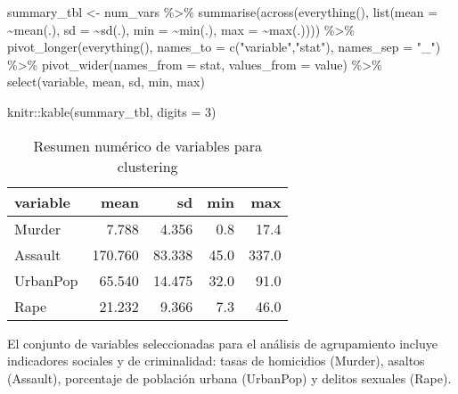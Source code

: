 \documentclass[
  spanish,
  11pt,
  a4paper,
  DIV=11,
  numbers=noendperiod]{scrartcl}
\newenvironment{Shaded}{\begin{snugshade}}{\end{snugshade}}
\newcommand{\AttributeTok}[1]{\textcolor[rgb]{0.40,0.45,0.13}{#1}}
\newcommand{\DecValTok}[1]{\textcolor[rgb]{0.68,0.00,0.00}{#1}}
\newcommand{\FunctionTok}[1]{\textcolor[rgb]{0.28,0.35,0.67}{#1}}
\newcommand{\NormalTok}[1]{\textcolor[rgb]{0.00,0.23,0.31}{#1}}
\newcommand{\OtherTok}[1]{\textcolor[rgb]{0.00,0.23,0.31}{#1}}
\newcommand{\SpecialCharTok}[1]{\textcolor[rgb]{0.37,0.37,0.37}{#1}}
\newcommand{\StringTok}[1]{\textcolor[rgb]{0.13,0.47,0.30}{#1}}
\begin{document}
\begin{Shaded}
\begin{Highlighting}[numbers=left,,]
\NormalTok{summary\_tbl }\OtherTok{\textless{}{-}}\NormalTok{ num\_vars }\SpecialCharTok{\%\textgreater{}\%}
\FunctionTok{summarise}\NormalTok{(}\FunctionTok{across}\NormalTok{(}\FunctionTok{everything}\NormalTok{(), }\FunctionTok{list}\NormalTok{(}\AttributeTok{mean =} \SpecialCharTok{\textasciitilde{}}\FunctionTok{mean}\NormalTok{(.), }\AttributeTok{sd =} \SpecialCharTok{\textasciitilde{}}\FunctionTok{sd}\NormalTok{(.),}
\AttributeTok{min =} \SpecialCharTok{\textasciitilde{}}\FunctionTok{min}\NormalTok{(.), }\AttributeTok{max =} \SpecialCharTok{\textasciitilde{}}\FunctionTok{max}\NormalTok{(.)))) }\SpecialCharTok{\%\textgreater{}\%}
\FunctionTok{pivot\_longer}\NormalTok{(}\FunctionTok{everything}\NormalTok{(), }\AttributeTok{names\_to =} \FunctionTok{c}\NormalTok{(}\StringTok{"variable"}\NormalTok{,}\StringTok{"stat"}\NormalTok{), }\AttributeTok{names\_sep =} \StringTok{"\_"}\NormalTok{) }\SpecialCharTok{\%\textgreater{}\%}
\FunctionTok{pivot\_wider}\NormalTok{(}\AttributeTok{names\_from =}\NormalTok{ stat, }\AttributeTok{values\_from =}\NormalTok{ value) }\SpecialCharTok{\%\textgreater{}\%}
\FunctionTok{select}\NormalTok{(variable, mean, sd, min, max)}

\NormalTok{knitr}\SpecialCharTok{::}\FunctionTok{kable}\NormalTok{(summary\_tbl, }\AttributeTok{digits =} \DecValTok{3}\NormalTok{)}
\end{Highlighting}
\end{Shaded}

\begin{longtable}[]{@{}lrrrr@{}}

\caption{\label{tbl-clust-prep}Resumen numérico de variables para
clustering}

\tabularnewline

\toprule\noalign{}
variable & mean & sd & min & max \\
\midrule\noalign{}
\endhead
\bottomrule\noalign{}
\endlastfoot
Murder & 7.788 & 4.356 & 0.8 & 17.4 \\
Assault & 170.760 & 83.338 & 45.0 & 337.0 \\
UrbanPop & 65.540 & 14.475 & 32.0 & 91.0 \\
Rape & 21.232 & 9.366 & 7.3 & 46.0 \\

\end{longtable}

El conjunto de variables seleccionadas para el análisis de agrupamiento
incluye indicadores sociales y de criminalidad: tasas de homicidios
(Murder), asaltos (Assault), porcentaje de población urbana (UrbanPop) y
delitos sexuales (Rape).
\end{document}
